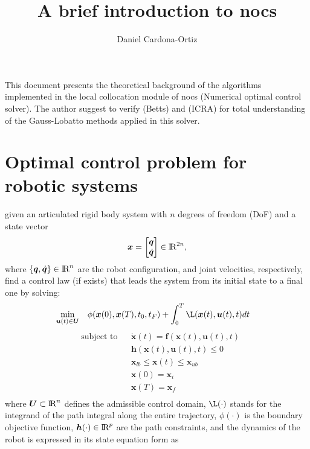 \documentclass[12pt]{article}
\title{A brief introduction to nocs}
\author{Daniel Cardona-Ortiz}
\affil{Robotics and Advanced Manufacturing Group, Cinvestav, Mexico}
\newcommand{\real}{\mbox{\rm I$\!$R}}
\begin{document}
\maketitle

This document presents the theoretical background of the algorithms implemented in the local collocation module of nocs (Numerical optimal control solver). The author suggest to verify (Betts) and (ICRA) for total understanding of the Gauss-Lobatto methods applied in this solver.

\section{Optimal control problem for robotic systems}

given an articulated rigid body system with $n$ degrees of freedom (DoF) and a state vector
%
\begin{equation}
\label{eq:state}
\bm{x}= \begin{bmatrix}\bm{q}
\\ \dot{\bm{q}}
\end{bmatrix} \in \real^{2n}, 
\end{equation}
%
where $\{\bm{q},\dot{\bm{q}}\} \in \real^{n}$ are the robot configuration, and joint velocities, respectively, find a control law (if exists) that leads the system from its initial state to a final one by solving:
%
\begin{equation} \label{eq:1}
\begin{aligned}
&\underset{\bm{u}(t) \in \bm{U}}{\text{min}} 
& & \phi(\bm{x}(0),\bm{x}(T),t_0,t_F)+\int_{0}^{T} \L(\bm{x}(t),\bm{u}(t),t) dt
\end{aligned}
\end{equation}
%
\begin{equation} \label{eq:2}
\begin{aligned}
& \text{subject to} & & \dot{\bm{x}}(t)=\bm{f}(\bm{x}(t),\bm{u}(t),t)\\
& & & \bm{h}(\bm{x}(t),\bm{u}(t),t) \leq 0\\
& & & \bm{x}_{lb}\leq \bm{x}(t) \leq \bm{x}_{ub}\\
& & & \bm{x}(0)=\bm{x}_{i}\\
& & & \bm{x}(T)=\bm{x}_{f}\\
\end{aligned}
\end{equation}
%
where $\bm{U}\subset\real^{n}$ defines the admissible control domain, $\L(\cdot)$ stands for the integrand of the path integral along the entire trajectory, $\phi(\cdot)$ is the boundary objective function, $\bm{h}(\cdot) \in \real^{p}$ are the path constraints, and the dynamics of the robot is expressed in its state equation form as
\end{document}
